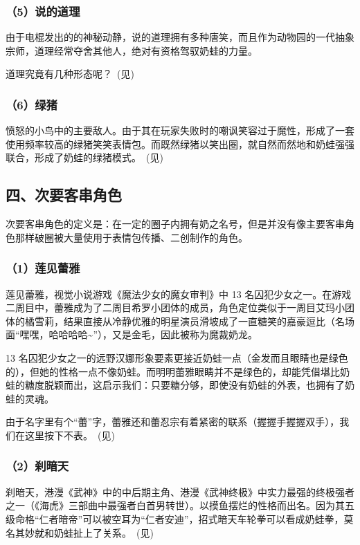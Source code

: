 \subsubsection{（5）说的道理}

由于电棍发出的的神秘动静，说的道理拥有多种唐笑，而且作为动物园的一代抽象宗师，道理经常夺舍其他人，绝对有资格驾驭奶蛙的力量。

道理究竟有几种形态呢？~(见)



\subsubsection{（6）绿猪}

愤怒的小鸟中的主要敌人。由于其在玩家失败时的嘲讽笑容过于魔性，形成了一套使用频率较高的绿猪笑笑表情包。而既然绿猪以笑出圈，就自然而然地和奶蛙强强联合，形成了奶蛙的绿猪模式。~(见)



\clearpage

\subsection{四、次要客串角色}

次要客串角色的定义是：在一定的圈子内拥有奶之名号，但是并没有像主要客串角色那样破圈被大量使用于表情包传播、二创制作的角色。

\subsubsection{（1）莲见蕾雅}

莲见蕾雅，视觉小说游戏《魔法少女的魔女审判》中 13 名囚犯少女之一。在游戏二周目中，蕾雅成为了二周目希罗小团体的成员，角色定位类似于一周目艾玛小团体的橘雪莉，结果直接从冷静优雅的明星演员滑坡成了一直糖笑的嘉豪逗比（名场面“嘿嘿，哈哈哈哈\textasciitilde{}”），又是金毛，因此被称为魔裁奶龙。

13 名囚犯少女之一的远野汉娜形象要素更接近奶蛙一点（金发而且眼睛也是绿色的），但她的性格一点不像奶蛙。而明明蕾雅眼睛并不是绿色的，却能凭借堪比奶蛙的糖度脱颖而出，这启示我们：只要糖分够，即使没有奶蛙的外表，也拥有了奶蛙的灵魂。

由于名字里有个“蕾”字，蕾雅还和蕾忍宗有着紧密的联系（握握手握握双手），我们在这里按下不表。~(见)



\subsubsection{（2）刹暗天}

刹暗天，港漫《武神》中的中后期主角、港漫《武神终极》中实力最强的终极强者之一（《海虎》三部曲中最强者白首男转世）。以摸鱼摆烂的性格而出名。因为其五级命格“仁者暗帝”可以被空耳为“仁者安迪”，招式暗天车轮拳可以看成奶蛙拳，莫名其妙就和奶蛙扯上了关系。~(见)



\clearpage


